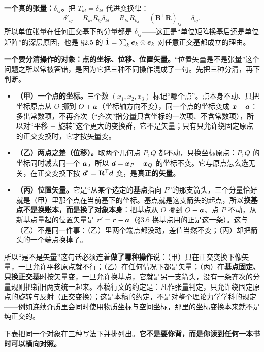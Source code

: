\documentclass[11pt]{ctexart}
\newcommand{\ten}[1]{\mathbf{#1}}
\newcommand{\unitd}{\hat{\ten{1}}}
\let\origsubhdr\subhdr
\renewcommand{\subhdr}[1]{\par\needspace{3\baselineskip}\origsubhdr{#1}}
\begin{document}
\textbf{一个真的张量：$\delta_{ij}$。}把 $T_{kl}=\delta_{kl}$ 代进变换律：
\[
\delta'_{ij}=R_{ki}R_{lj}\delta_{kl}=R_{ki}R_{kj}=(\ten R^{\mathsf T}\ten R)_{ij}=\delta_{ij}.
\]
所以单位张量在任何正交基下的分量都是 $\delta_{ij}$——这正是“单位矩阵换基后还是单位矩阵”的深层原因，也是 \S2.5 的 $\unitd=\sum_k\vect e_k\otimes\vect e_k$ 对任意正交基都成立的理由。

\textbf{一个要分清操作的对象：点的坐标、位移、位置矢量。}“位置矢量是不是张量”这个问题之所以常被答错，是因为它把三种不同操作混成了一句。先把三种分清，再下判断。
\begin{itemize}[leftmargin=1.8em,itemsep=2pt]
\item \textbf{（甲）一个点的坐标。}三个数 $(x_1,x_2,x_3)$ 标记“哪个点”。点本身不动、只把坐标原点从 $O$ 挪到 $O+\boldsymbol{a}$（坐标轴方向不变），同一个点的坐标变成 $\boldsymbol{x}-\boldsymbol{a}$：多出常数项，不再齐次（“齐次”指分量只含坐标的一次项、不含常数项），所以对“平移 $+$ 旋转”这个更大的变换群，它不是矢量；只有只允许绕固定原点的正交变换时，它才按矢量变。
\item \textbf{（乙）两点之差（位移）。}取两个几何点 $P,Q$ 都不动，只换坐标原点：$P,Q$ 的坐标同时减去同一个 $\boldsymbol{a}$，所以 $\boldsymbol{d}=\boldsymbol{x}_P-\boldsymbol{x}_Q$ 的坐标不变。它与原点怎么选无关，在正交变换下按 $\vect d'=\ten R^{\mathsf T}\vect d$ 变，是\textbf{真正的矢量}。
\item \textbf{（丙）位置矢量。}它是“从某个选定的\textbf{基点}指向 $P$”的那支箭头，三个分量恰好就是（甲）里那个点在当前基下的坐标。基点就是这支箭头的起点，所以\textbf{换基点不是换账本，而是换了对象本身}：把基点从 $O$ 挪到 $O+\boldsymbol{a}$、点 $P$ 不动，从新基点量起的位置矢量是 $\boldsymbol{r}'=\boldsymbol{r}-\boldsymbol{a}$（\S3.6 换基点用的正是这一条）。这与（乙）不是同一件事：（乙）里两个端点都没动，差值当然不变；（丙）却把箭头的一个端点换掉了。
\end{itemize}
所以“是不是矢量”这句话必须连着\textbf{做了哪种操作}说：（甲）只在正交变换下像矢量，一旦允许平移原点就不行；（乙）在任何情况下都是矢量；（丙）在\textbf{基点固定、只换正交基}时按矢量变，一旦允许换基点，它就是另一支箭头，没有一条齐次的分量规则把新旧两支统一起来。本稿行文的约定是：凡作张量判定，只允许绕固定原点的旋转与反射（正交变换）；这是本稿的约定，不是对整个理论力学学科的规定——例如连续介质里会同时使用物质坐标与空间坐标，那里的坐标变换本来就不是纯正交的。

\label{subsec:dictionary}

下表把同一个对象在三种写法下并排列出。\textbf{它不是要你背，而是你读到任何一本书时可以横向对照。}
\end{document}
